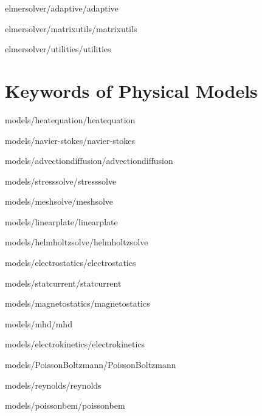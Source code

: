 \documentclass[a4paper,english,10pt]{report}    %
\newcommand{\Include}{} %
\begin{document}
\graphicspath{{./}{adaptive/}}
\Include{elmersolver/adaptive/adaptive}

\graphicspath{{./}{matrixutils/}}
\Include{elmersolver/matrixutils/matrixutils}

\graphicspath{{./}{utilities/}}
\Include{elmersolver/utilities/utilities}



\chapter{Keywords of Physical Models}

\graphicspath{{./}{heatequation/}}
\Include{models/heatequation/heatequation}

\graphicspath{{./}{navier-stokes/}}
\Include{models/navier-stokes/navier-stokes}

\graphicspath{{./}{advectiondiffusion/}}
\Include{models/advectiondiffusion/advectiondiffusion}

\graphicspath{{./}{stresssolve/}}
\Include{models/stresssolve/stresssolve}

\graphicspath{{./}{meshsolve/}}
\Include{models/meshsolve/meshsolve}

\graphicspath{{./}{linearplate/}}
\Include{models/linearplate/linearplate}



\graphicspath{{./}{helmholtzsolve/}}
\Include{models/helmholtzsolve/helmholtzsolve}

\graphicspath{{./}{electrostatics/}}
\Include{models/electrostatics/electrostatics}

\graphicspath{{./}{statcurrent/}}
\Include{models/statcurrent/statcurrent}

\graphicspath{{./}{magnetostatics/}}
\Include{models/magnetostatics/magnetostatics}

\graphicspath{{./}{mhd/}}
\Include{models/mhd/mhd}

\graphicspath{{./}{electrokinetics/}}
\Include{models/electrokinetics/electrokinetics}

\graphicspath{{./}{PoissonBoltzmann/}}
\Include{models/PoissonBoltzmann/PoissonBoltzmann}

\graphicspath{{./}{reynolds/}}
\Include{models/reynolds/reynolds}

\graphicspath{{./}{poissonbem/}}
\Include{models/poissonbem/poissonbem}
\end{document}
